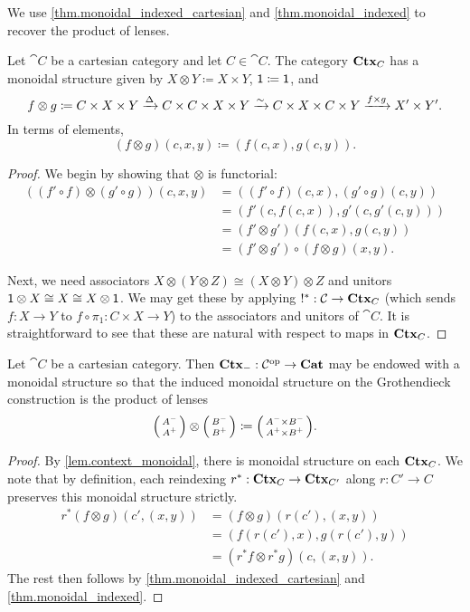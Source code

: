\documentclass[DynamicalBook]{subfiles}
\begin{document}
We use \cref{thm.monoidal_indexed_cartesian} and \cref{thm.monoidal_indexed} to
recover the product of lenses.
\begin{lemma}\label{lem.context_monoidal}
Let $\cat{C}$ be a cartesian category and let $C \in \cat{C}$. The category
$\textbf{Ctx}_{C}$ has a monoidal structure given by $X \otimes Y \coloneqq X \times
Y$, $\mathsf{1} \coloneqq \mathsf{1}$, and 
  $$f \otimes g \coloneqq C \times X \times Y \xrightarrow{\Delta} C \times C \times X
  \times Y \xrightarrow{\sim} C \times X \times C \times Y \xrightarrow{f \times g} X' \times Y'.$$
In terms of elements, 
$$(f \otimes g)(c, x, y) \coloneqq (f(c, x), g(c, y)).$$
\end{lemma}
\begin{proof}
  We begin by showing that $\otimes$ is functorial:
\begin{align*}
  ( (f' \circ f) \otimes (g' \circ g))(c, x, y) &= ((f' \circ f)(c, x), (g' \circ g)(c, y))\\
&= (f'(c, f(c, x)), g'(c, g'(c, y))) \\
  &= (f' \otimes g')(f(c, x), g(c, y)) \\
&= (f' \otimes g') \circ (f \otimes g)(x, y).
\end{align*}

Next, we need associators $X \otimes (Y \otimes Z) \cong (X \otimes Y) \otimes
Z$ and unitors $\mathsf{1} \otimes X \cong X \cong X \otimes \mathsf{1}$. We may
get these by applying $!^{\ast} : \mathcal{C} \to \textbf{Ctx}_{C}$ (which sends $f : X \to
Y$ to $f \circ \pi_1 : C \times X \to Y$) to the associators and unitors of
$\cat{C}$. It is straightforward to see that these are natural with respect to maps in $\textbf{Ctx}_{C}$. 
\end{proof}


\begin{proposition}
Let $\cat{C}$ be a cartesian category. Then $\textbf{Ctx}_{-} : \mathcal{C}^{\textnormal{op}} \to
\textbf{Cat}$ may be endowed with a monoidal structure so that the induced monoidal
structure on the Grothendieck construction is the product of lenses
$$\lens{A^-}{A^+} \otimes \lens{B^-}{B^+} \coloneqq \lens{A^- \times B^-}{A^+
  \times B^+}.$$
\end{proposition}
\begin{proof}
By \cref{lem.context_monoidal}, there is monoidal structure on each $\textbf{Ctx}_{C}$.
We note that by definition, each reindexing $r^{\ast} : \textbf{Ctx}_{C} \to
\textbf{Ctx}_{C'}$ along $r : C' \to C$ preserves this monoidal structure strictly.
\begin{align*}
r^{\ast}(f \otimes g)(c', (x, y)) &= (f \otimes g)(r(c'), (x, y)) \\
&= (f(r(c'), x), g(r(c'), y)) \\
&= (r^{\ast}f \otimes r^{\ast} g)(c, (x, y)).
\end{align*}
The rest then follows by \cref{thm.monoidal_indexed_cartesian} and \cref{thm.monoidal_indexed}.
\end{proof}
\end{document}
